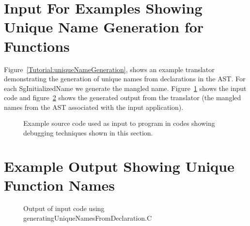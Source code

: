 \section{Input For Examples Showing Unique Name Generation for Functions}

Figure~\ref{Tutorial:uniqueNameGeneration},
shows an example translator demonstrating the generation of unique names from 
declarations in the AST.  For each SgInitializedName we generate the
mangled name.  Figure~\ref{Tutorial:exampleInputCode_UniqueFunctionNameGeneration} 
shows the input code and 
figure~\ref{Tutorial:exampleOutput_UniqueFunctionNameGeneration}
shows the generated output from the translator (the mangled names from
the AST associated with the input application).

\begin{figure}[!h]
{\indent
{\mySmallFontSize


\begin{latexonly}
   
\end{latexonly}

\begin{htmlonly}
   
\end{htmlonly}

}
}
\caption{Example source code used as input to program in
         codes showing debugging techniques shown in this section.}
\label{Tutorial:exampleInputCode_UniqueFunctionNameGeneration}
\end{figure}


\section{Example Output Showing Unique Function Names}

\begin{figure}[!h]
{\indent
{\mySmallestFontSize


\begin{latexonly}
   
\end{latexonly}

\begin{htmlonly}
   
\end{htmlonly}

}
}
\caption{Output of input code using generatingUniqueNamesFromDeclaration.C}
\label{Tutorial:exampleOutput_UniqueFunctionNameGeneration}
\end{figure}


